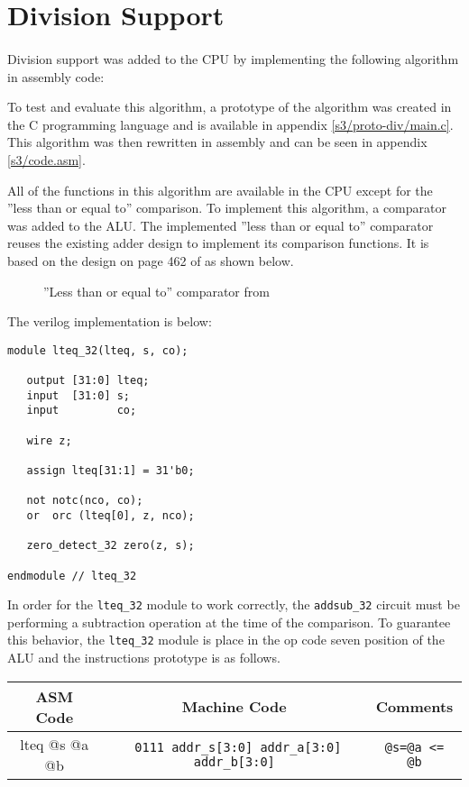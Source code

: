 \documentclass[11pt,letterpaper,final]{article}
\begin{document}
\section{ Division Support }
\paragraph{}
Division support was added to the CPU by implementing the following algorithm in assembly code:

To test and evaluate this algorithm, a prototype of the algorithm was created in 
the C programming language and is available in appendix \ref{s3/proto-div/main.c}.
This algorithm was then rewritten in assembly and can be seen in appendix \ref{s3/code.asm}.

All of the functions in this algorithm are available in the CPU except for the 
''less than or equal to'' comparison.  To implement this algorithm, a comparator was 
added to the ALU. The implemented ''less than or equal to'' comparator reuses the 
existing adder design to implement its comparison functions. It is based on the 
design on page 462 of \cite{cmosvlsi} as shown below.
\begin{figure}[H]
  \centering
  \label{fig:comparator}
  \caption{''Less than or equal to'' comparator from  \cite{cmosvlsi}}
\end{figure}

The verilog implementation is below:


\begin{lstlisting}
module lteq_32(lteq, s, co);
   
   output [31:0] lteq;
   input  [31:0] s;
   input         co;
   
   wire z;
   
   assign lteq[31:1] = 31'b0;
   
   not notc(nco, co);
   or  orc (lteq[0], z, nco); 
   
   zero_detect_32 zero(z, s);

endmodule // lteq_32 
\end{lstlisting}

In order for the \verb|lteq_32| module to work correctly, the \verb|addsub_32| 
circuit must be performing a subtraction operation at the time of the comparison.  
To guarantee this behavior, the \verb|lteq_32| module is place in the op code 
seven position of the ALU and the instructions prototype is as follows.

\begin{center} 
\begin{small}
\begin{tabular}{ | c | c | c | } 
\hline ASM Code      & Machine Code                                     & Comments           \\
\hline lteq @s @a @b & \verb| 0111 addr_s[3:0] addr_a[3:0] addr_b[3:0]| & \verb|@s=@a <= @b| \\
\hline 
\end{tabular}
\end{small}
\end{center}
\end{document}
